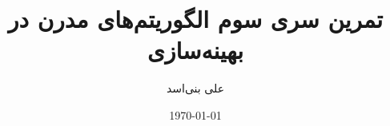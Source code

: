\documentclass[12pt,onecolumn,a4paper]{article}
\begin{document}
	\title{تمرین سری  سوم الگوریتم‌های مدرن در بهینه‌سازی} 
	\author{علی بنی‌اسد}
	\date{\today}
	\maketitle
	
	
\end{document}
